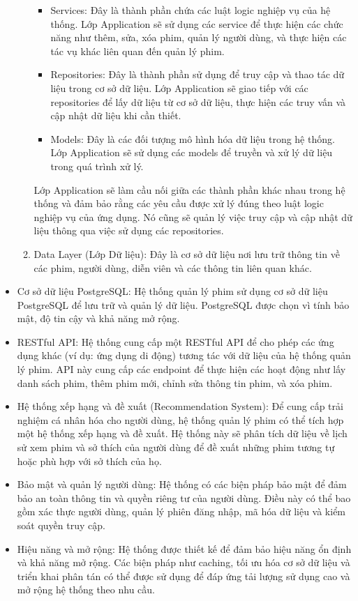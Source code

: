 \documentclass[12pt]{article}
\begin{document}
\begin{itemize}
\begin{enumerate}
\begin{itemize}
                \item  Services: Đây là thành phần chứa các luật logic nghiệp vụ của hệ thống. Lớp Application sẽ sử dụng các service để thực hiện các chức năng như thêm, sửa, xóa phim, quản lý người dùng, và thực hiện các tác vụ khác liên quan đến quản lý phim.
                
                \item  Repositories: Đây là thành phần sử dụng để truy cập và thao tác dữ liệu trong cơ sở dữ liệu. Lớp Application sẽ giao tiếp với các repositories để lấy dữ liệu từ cơ sở dữ liệu, thực hiện các truy vấn và cập nhật dữ liệu khi cần thiết.
            
                \item  Models: Đây là các đối tượng mô hình hóa dữ liệu trong hệ thống. Lớp Application sẽ sử dụng các models để truyền và xử lý dữ liệu trong quá trình xử lý.
            \end{itemize}

            Lớp Application sẽ làm cầu nối giữa các thành phần khác nhau trong hệ thống và đảm bảo rằng các yêu cầu được xử lý đúng theo luật logic nghiệp vụ của ứng dụng. Nó cũng sẽ quản lý việc truy cập và cập nhật dữ liệu thông qua việc sử dụng các repositories.

            \item Data Layer (Lớp Dữ liệu): Đây là cơ sở dữ liệu nơi lưu trữ thông tin về các phim, người dùng, diễn viên và các thông tin liên quan khác.

        \end{enumerate}
    \item Cơ sở dữ liệu PostgreSQL: Hệ thống quản lý phim sử dụng cơ sở dữ liệu PostgreSQL để lưu trữ và quản lý dữ liệu. PostgreSQL được chọn vì tính bảo mật, độ tin cậy và khả năng mở rộng.
    \item RESTful API: Hệ thống cung cấp một RESTful API để cho phép các ứng dụng khác (ví dụ: ứng dụng di động) tương tác với dữ liệu của hệ thống quản lý phim. API này cung cấp các endpoint để thực hiện các hoạt động như lấy danh sách phim, thêm phim mới, chỉnh sửa thông tin phim, và xóa phim.
    \item Hệ thống xếp hạng và đề xuất (Recommendation System): Để cung cấp trải nghiệm cá nhân hóa cho người dùng, hệ thống quản lý phim có thể tích hợp một hệ thống xếp hạng và đề xuất. Hệ thống này sẽ phân tích dữ liệu về lịch sử xem phim và sở thích của người dùng để đề xuất những phim tương tự hoặc phù hợp với sở thích của họ.
    \item Bảo mật và quản lý người dùng: Hệ thống có các biện pháp bảo mật để đảm bảo an toàn thông tin và quyền riêng tư của người dùng. Điều này có thể bao gồm xác thực người dùng, quản lý phiên đăng nhập, mã hóa dữ liệu và kiểm soát quyền truy cập.
    \item Hiệu năng và mở rộng: Hệ thống được thiết kế để đảm bảo hiệu năng ổn định và khả năng mở rộng. Các biện pháp như caching, tối ưu hóa cơ sở dữ liệu và triển khai phân tán có thể được sử dụng để đáp ứng tải lượng sử dụng cao và mở rộng hệ thống theo nhu cầu.
\end{itemize}
\end{document}
